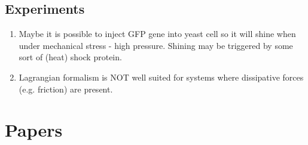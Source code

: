 \documentclass[10pt,a4paper]{article}
\begin{document}
\subsection{Experiments}
\begin{enumerate}
 \item Maybe it is possible to inject GFP gene into yeast cell so it will shine when under mechanical stress - high pressure. 
 Shining may be triggered by some sort of (heat) shock protein.
 \item Lagrangian formalism is NOT well suited for systems where dissipative forces (e.g. friction) are present.
\end{enumerate}

 

\section{Papers}
\end{document}
